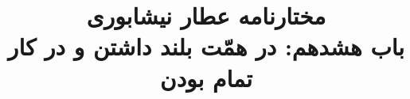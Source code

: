 \documentclass[14pt,b5paper]{article}
\begin{document}
\title{\Huge مختارنامه عطار نیشابوری \\
باب هشدهم: در همّت بلند داشتن و در کار تمام بودن}
\author{ }
\date{ }
\maketitle
\newpage
\tableofcontents
\newpage

\newpage

\newpage

\newpage

\newpage

\newpage

\newpage

\newpage

\newpage

\newpage

\newpage

\newpage

\newpage

\newpage

\newpage

\newpage

\newpage

\newpage

\newpage

\newpage

\newpage

\newpage

\newpage

\newpage

\newpage

\newpage

\newpage

\newpage

\newpage

\newpage

\newpage

\newpage

\newpage

\newpage

\newpage

\newpage

\newpage

\newpage

\newpage

\newpage

\newpage

\newpage

\newpage

\newpage

\newpage

\newpage

\newpage

\newpage

\newpage

\newpage

\newpage
\end{document}
